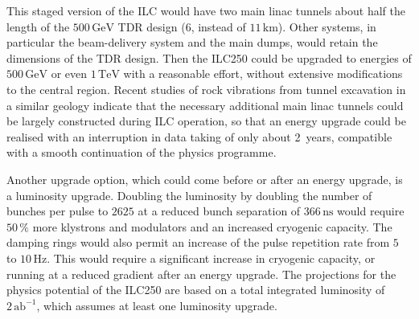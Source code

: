 \documentclass[%
 reprint,
 amsmath,amssymb,
 aps,
]{revtex4-1}
\begin{document}
This staged version of the ILC  
would have two main linac tunnels about half the length of the
$500\,{\mathrm{GeV}}$ TDR design    ($6$, instead of $11\,{\mathrm{km}}$).
Other systems, in particular the beam-delivery system and the 
main dumps, would retain the dimensions of the TDR design.
Then the ILC250 could be upgraded to energies of $500\,{\mathrm{GeV}}$
or even $1\,{\mathrm{TeV}}$ with a reasonable effort, without
extensive
 modifications to the central region. 
Recent studies of rock vibrations from tunnel excavation in a similar
geology indicate that the necessary additional main linac tunnels
could be largely constructed during ILC operation, so that an energy
upgrade could be realised with an interruption in data taking of only
about 2~years, 
compatible with a smooth 
continuation of the physics programme.

Another upgrade option, which could come before or after an energy upgrade, is a luminosity upgrade. 
Doubling the luminosity by doubling the number of bunches per pulse to $2625$ at a reduced bunch separation of $366\,{\mathrm{ns}}$ would require $50\,\%$ more klystrons and modulators and an increased cryogenic capacity. 
The damping rings would also permit an increase of the pulse
 repetition rate from $5$ to $10\,{\mathrm{Hz}}$.  
This would require a significant increase in cryogenic capacity, 
or running at a reduced gradient after an energy upgrade.
The projections for the physics potential 
of the ILC250 are based on a total integrated 
luminosity of $2\,{\mathrm{ab}}^{-1}$, which assumes at least one luminosity upgrade.

\end{document}
